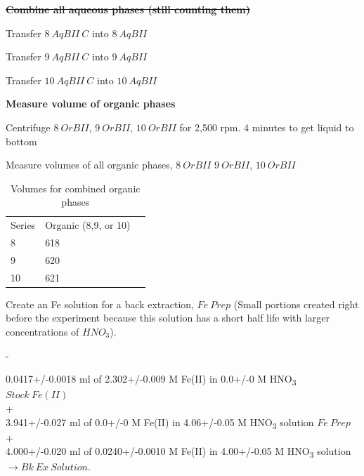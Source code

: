 \documentclass[idxtotoc,hyperref,openany,oneside]{labbook} %
\newcommand{\cmark}{\ding{51}}%
\newcommand{\done}{\rlap{$\square$}{\raisebox{2pt}{\large\hspace{1pt}\cmark}}%
  \hspace{-2.5pt}}
\newcommand{\tsbs}{\textsubscript}
\begin{document}
\textbf{\st{Combine all aqueous phases (still counting them)}}
\begin{todolist}
\item{Transfer $\boxed{8\ AqBII\ C}$ into $\boxed{8\ AqBII}$}
\item{Transfer $\boxed{9\ AqBII\ C}$ into $\boxed{9\ AqBII}$}
\item{Transfer $\boxed{10\ AqBII\ C}$ into $\boxed{10\ AqBII}$}
\end{todolist}

\textbf{Measure volume of organic phases}
\begin{todolist}
\item[\done]{Centrifuge $\boxed{8\ OrBII}$, $\boxed{9\ OrBII}$,
  $\boxed{10\ OrBII}$ for 2,500 rpm. 4 minutes to get liquid to
  bottom}
\item[\done]{Measure volumes of all organic phases, $\boxed{8\ OrBII}$
     $\boxed{9\ OrBII}$, $\boxed{10\ OrBII}$}
\begin{table}[H]
  \begin{center}
    \caption{Volumes for combined organic phases}
    \begin{tabular}{l l l}
      \toprule
      Series & Organic (8,9, or 10)\\ 
      8 & 618 \\
      9 & 620\\
      10 & 621\\
      \bottomrule
    \end{tabular}
  \end{center}
\end{table}  
\end{todolist}

Create an Fe solution for a back extraction, $\boxed{Fe\ Prep}$
(Small portions created right before the experiment because this
solution has a short half life with larger concentrations of $HNO_3$).

\begin{todolist}
\item[\done]{-}
\end{todolist}
\begin{center}
0.0417+/-0.0018 ml of 2.302+/-0.009 M Fe(II) in 0.0+/-0 M HNO\tsbs{3} $\boxed{Stock\ Fe(II)}$\\
+\\
3.941+/-0.027 ml of 0.0+/-0 M Fe(II) in 4.06+/-0.05 M HNO\tsbs{3} solution $\boxed{Fe\ Prep}$\\
+\\
4.000+/-0.020 ml of 0.0240+/-0.0010 M Fe(II) in 4.00+/-0.05 M HNO\tsbs{3} solution $\boxed{\rightarrow Bk\ Ex\ Solution}$.
\end{center}
\end{document}
